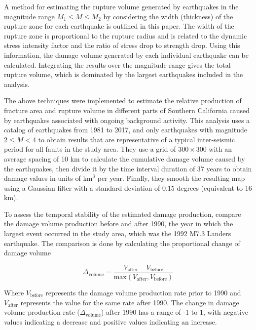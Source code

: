 \documentclass[12pt]{article} %
\theoremstyle{plain}
\begin{document}
	
	A method for estimating the rupture volume generated by earthquakes in the magnitude range $M_1 \leq M \leq M_2$ by considering the width (thickness) of the rupture zone for each earthquake is outlined in this paper. The width of the rupture zone is proportional to the rupture radius and is related to the dynamic stress intensity factor and the ratio of stress drop to strength drop. Using this information, the damage volume generated by each individual earthquake can be calculated. Integrating the results over the magnitude range gives the total rupture volume, which is dominated by the largest earthquakes included in the analysis. 
	
	The above techniques were implemented to estimate the relative production of fracture area and rupture volume in different parts of Southern California caused by earthquakes associated with ongoing background activity. This analysis uses a catalog of earthquakes from 1981 to 2017, and only earthquakes with magnitude $2 \leq M <4$ to obtain results that are representative of a typical inter-seismic period for all faults in the study area. They use a grid of $300 \times 300$ with an average spacing of 10 km to calculate the cumulative damage volume caused by the earthquakes, then divide it by the time interval duration of 37 years to obtain damage values in units of $\text{km}^3$ per year. Finally, they smooth the resulting map using a Gaussian filter with a standard deviation of 0.15 degrees (equivalent to 16 km).
	
	To assess the temporal stability of the estimated damage production, compare the damage volume production before and after 1990, the year in which the largest event occurred in the study area, which was the 1992 M7.3 Landers earthquake. The comparison is done by calculating the proportional change of damage volume
	
	\begin{equation} \label{eq:damage_volume}
	\Delta_{\text{volume}} = \frac{V_{\text{after}}-V_{\text{before}}}{\text{max}(V_{\text{after}},V_{\text{before}})} 
	\end{equation}
	
	\noindent Where $V_{\text{before}}$ represents the damage volume production rate prior to 1990 and $V_{\text{after}}$ represents the value for the same rate after 1990. The change in damage volume production rate ($\Delta_{\text{volume}}$) after 1990 has a range of -1 to 1, with negative values indicating a decrease and positive values indicating an increase.
	
\end{document}
